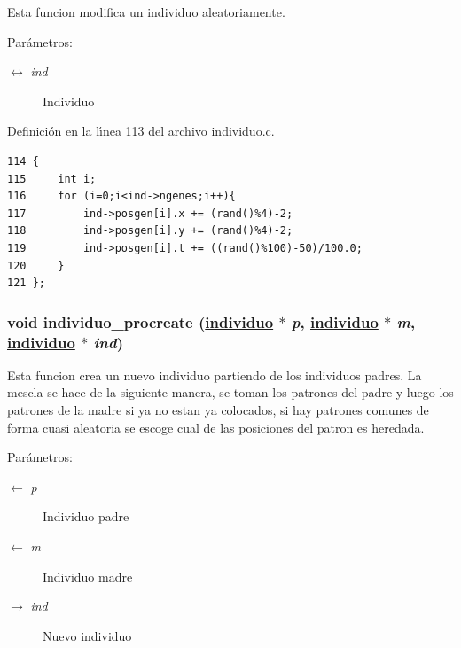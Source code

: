 Esta funcion modifica un individuo aleatoriamente.

\begin{Desc}
\item[Par\'{a}metros:]
\begin{description}
\item[\mbox{$\leftrightarrow$} {\em ind}]Individuo \end{description}
\end{Desc}


Definici\'{o}n en la l\'{\i}nea 113 del archivo individuo.c.

\begin{Code}\begin{verbatim}114 {
115     int i;
116     for (i=0;i<ind->ngenes;i++){
117         ind->posgen[i].x += (rand()%4)-2;
118         ind->posgen[i].y += (rand()%4)-2;
119         ind->posgen[i].t += ((rand()%100)-50)/100.0;
120     }
121 };
\end{verbatim}\end{Code}


\hypertarget{group__genetic_g18105662f4835e24cf3b8fc40ed63b33_g18105662f4835e24cf3b8fc40ed63b33}{
\subsubsection[individuo\_\-procreate]{\setlength{\rightskip}{0pt plus 5cm}void individuo\_\-procreate (\hyperlink{struct__individuo}{individuo} $\ast$ {\em p}, \hyperlink{struct__individuo}{individuo} $\ast$ {\em m}, \hyperlink{struct__individuo}{individuo} $\ast$ {\em ind})}}
\label{group__genetic_g18105662f4835e24cf3b8fc40ed63b33_g18105662f4835e24cf3b8fc40ed63b33}


Esta funcion crea un nuevo individuo partiendo de los individuos padres. La mescla se hace de la siguiente manera, se toman los patrones del padre y luego los patrones de la madre si ya no estan ya colocados, si hay patrones comunes de forma cuasi aleatoria se escoge cual de las posiciones del patron es heredada.

\begin{Desc}
\item[Par\'{a}metros:]
\begin{description}
\item[\mbox{$\leftarrow$} {\em p}]Individuo padre \item[\mbox{$\leftarrow$} {\em m}]Individuo madre \item[\mbox{$\rightarrow$} {\em ind}]Nuevo individuo \end{description}
\end{Desc}


